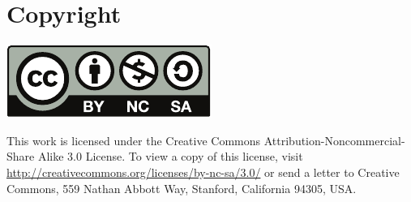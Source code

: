 \documentclass[
	12pt,
	a4paper,
	twoside,
	english,
	headsepline,
	footnosepline,
	automark,
	normalheadings,
	openany,
	cleardoubleplain,
	abstracton,
	idxtotoc,
	liststotoc,
	bibtotoc,
 	BCOR8mm,
]{scrartcl}
\begin{document}
\vfill
\section*{Copyright}
\begin{center}
 \includegraphics[scale=0.5]{by-nc-sa}
\end{center}
This work is licensed under the Creative Commons Attribution-Noncommercial-Share
Alike 3.0 License. To view a copy of this license, visit
\url{http://creativecommons.org/licenses/by-nc-sa/3.0/} or send a letter to
Creative Commons, 559 Nathan Abbott Way, Stanford, California 94305, USA.
\end{document}
